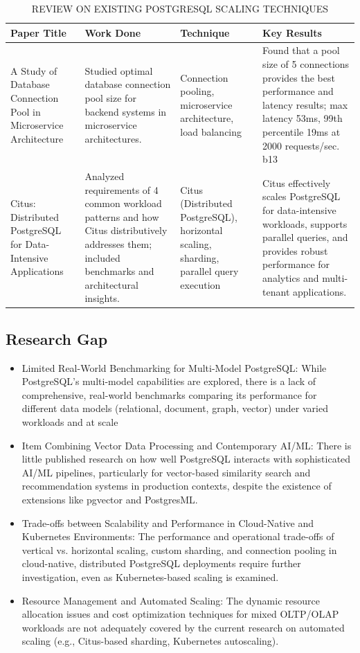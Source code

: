 \documentclass[conference]{IEEEtran}
\begin{document}
\begin{table}[htbp]
\centering
\small
\begin{tabular}{|p{1.6cm}|p{1.8cm}|p{2.0cm}|p{1.8cm}|}
\hline
\textbf{Paper Title} & \textbf{Work Done} & \textbf{Technique} & \textbf{Key Results} \\
\hline
A Study of Database Connection Pool in Microservice Architecture\cite{b13} & Studied optimal database connection pool size for backend systems in microservice architectures. & Connection pooling, microservice architecture, load balancing & Found that a pool size of 5 connections provides the best performance and latency results; max latency 53ms, 99th percentile 19ms at 2000 requests/sec. {b13}\\
\hline
Citus: Distributed PostgreSQL for Data-Intensive Applications\cite{b14} & Analyzed requirements of 4 common workload patterns and how Citus distributively addresses them; included benchmarks and architectural insights. & Citus (Distributed PostgreSQL), horizontal scaling, sharding, parallel query execution & Citus effectively scales PostgreSQL for data-intensive workloads, supports parallel queries, and provides robust performance for analytics and multi-tenant applications.\\
\hline
\end{tabular}
\hline
\caption{REVIEW ON EXISTING POSTGRESQL SCALING TECHNIQUES}
\label{tab:postgresql_research_summary}
\end{table}

\subsection{Research Gap}
\begin{itemize}
\item Limited Real-World Benchmarking for Multi-Model PostgreSQL: While PostgreSQL’s multi-model capabilities are explored, there is a lack of comprehensive, real-world benchmarks comparing its performance for different data models (relational, document, graph, vector) under varied workloads and at scale
\item Item Combining Vector Data Processing and Contemporary AI/ML: There is little published research on how well PostgreSQL interacts with sophisticated AI/ML pipelines, particularly for vector-based similarity search and recommendation systems in production contexts, despite the existence of extensions like pgvector and PostgresML. 
\item Trade-offs between Scalability and Performance in Cloud-Native and Kubernetes Environments: The performance and operational trade-offs of vertical vs. horizontal scaling, custom sharding, and connection pooling in cloud-native, distributed PostgreSQL deployments require further investigation, even as Kubernetes-based scaling is examined. 
\item Resource Management and Automated Scaling: The dynamic resource allocation issues and cost optimization techniques for mixed OLTP/OLAP workloads are not adequately covered by the current research on automated scaling (e.g., Citus-based sharding, Kubernetes autoscaling). 
\end{itemize}
\end{document}
